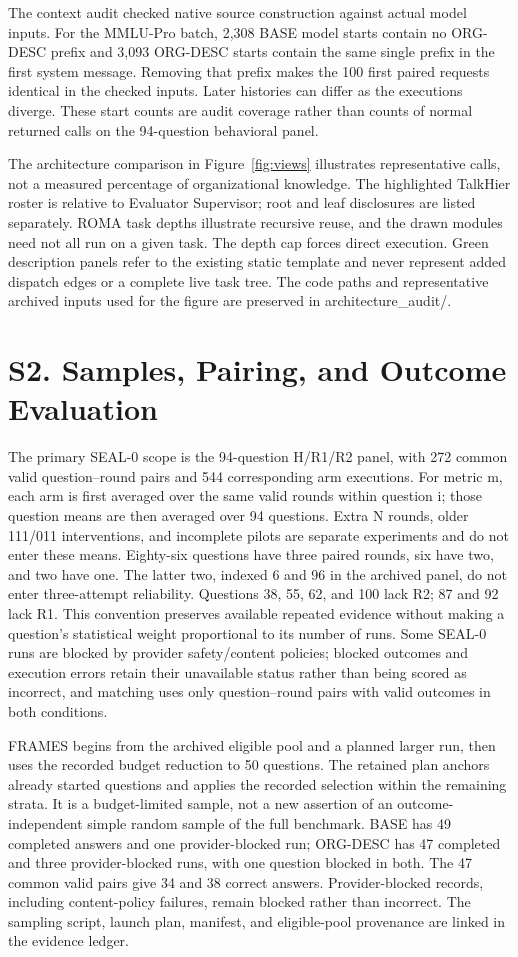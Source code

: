 \documentclass[10pt,letterpaper,twocolumn]{article}
\begin{document}
The context audit checked native source construction against actual model inputs. For the MMLU-Pro batch, 2,308 BASE model starts contain no ORG-DESC prefix and 3,093 ORG-DESC starts contain the same single prefix in the first system message. Removing that prefix makes the 100 first paired requests identical in the checked inputs. Later histories can differ as the executions diverge. These start counts are audit coverage rather than counts of normal returned calls on the 94-question behavioral panel.


The architecture comparison in Figure~\ref{fig:views} illustrates representative calls, not a measured percentage of organizational knowledge. The highlighted TalkHier roster is relative to Evaluator Supervisor; root and leaf disclosures are listed separately. ROMA task depths illustrate recursive reuse, and the drawn modules need not all run on a given task. The depth cap forces direct execution. Green description panels refer to the existing static template and never represent added dispatch edges or a complete live task tree. The code paths and representative archived inputs used for the figure are preserved in architecture\_audit/.


\section*{S2. Samples, Pairing, and Outcome Evaluation}

The primary SEAL-0 scope is the 94-question H/R1/R2 panel, with 272 common valid question--round pairs and 544 corresponding arm executions. For metric m, each arm is first averaged over the same valid rounds within question i; those question means are then averaged over 94 questions. Extra N rounds, older 111/011 interventions, and incomplete pilots are separate experiments and do not enter these means. Eighty-six questions have three paired rounds, six have two, and two have one. The latter two, indexed 6 and 96 in the archived panel, do not enter three-attempt reliability. Questions 38, 55, 62, and 100 lack R2; 87 and 92 lack R1. This convention preserves available repeated evidence without making a question's statistical weight proportional to its number of runs. Some SEAL-0 runs are blocked by provider safety/content policies; blocked outcomes and execution errors retain their unavailable status rather than being scored as incorrect, and matching uses only question--round pairs with valid outcomes in both conditions.


FRAMES begins from the archived eligible pool and a planned larger run, then uses the recorded budget reduction to 50 questions. The retained plan anchors already started questions and applies the recorded selection within the remaining strata. It is a budget-limited sample, not a new assertion of an outcome-independent simple random sample of the full benchmark. BASE has 49 completed answers and one provider-blocked run; ORG-DESC has 47 completed and three provider-blocked runs, with one question blocked in both. The 47 common valid pairs give 34 and 38 correct answers. Provider-blocked records, including content-policy failures, remain blocked rather than incorrect. The sampling script, launch plan, manifest, and eligible-pool provenance are linked in the evidence ledger.
\end{document}
